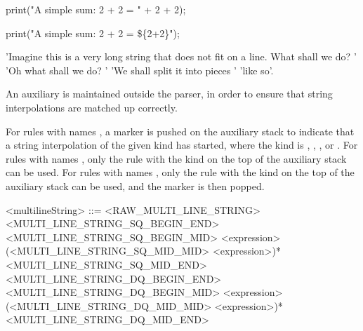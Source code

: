 \documentclass[makeidx]{article}
\begin{document}
{\begin{dartCode}
print("A simple sum: 2 + 2 = " +
            2 + 2);
\end{dartCode}


\begin{dartCode}
print("A simple sum: 2 + 2 = \$\{2+2\}");
\end{dartCode}


\begin{dartCode}
'Imagine this is a very long string that does not fit on a line. What shall we do? '
'Oh what shall we do? '
'We shall split it into pieces '
'like so'.
\end{dartCode}

\LMHash{}%
An auxiliary
is maintained outside the parser,
in order to ensure that string interpolations are matched up correctly.


\LMHash{}%
For rules with names ,
a marker is pushed on the auxiliary stack to indicate that
a string interpolation of the given kind has started,
where the kind is \lit{\sq}, , \lit{\sqsqsq}, or .
For rules with names ,
only the rule with the kind on the top of the auxiliary stack can be used.
For rules with names ,
only the rule with the kind on the top of the auxiliary stack can be used,
and the marker is then popped.

\begin{grammar}
<multilineString> ::= <RAW\_MULTI\_LINE\_STRING>
  \alt <MULTI\_LINE\_STRING\_SQ\_BEGIN\_END>
  \alt <MULTI\_LINE\_STRING\_SQ\_BEGIN\_MID> <expression> \gnewline{}
       (<MULTI\_LINE\_STRING\_SQ\_MID\_MID> <expression>)* \gnewline{}
       <MULTI\_LINE\_STRING\_SQ\_MID\_END>
  \alt <MULTI\_LINE\_STRING\_DQ\_BEGIN\_END>
  \alt <MULTI\_LINE\_STRING\_DQ\_BEGIN\_MID> <expression> \gnewline{}
       (<MULTI\_LINE\_STRING\_DQ\_MID\_MID> <expression>)* \gnewline{}
       <MULTI\_LINE\_STRING\_DQ\_MID\_END>


\end{grammar}}
\end{document}
